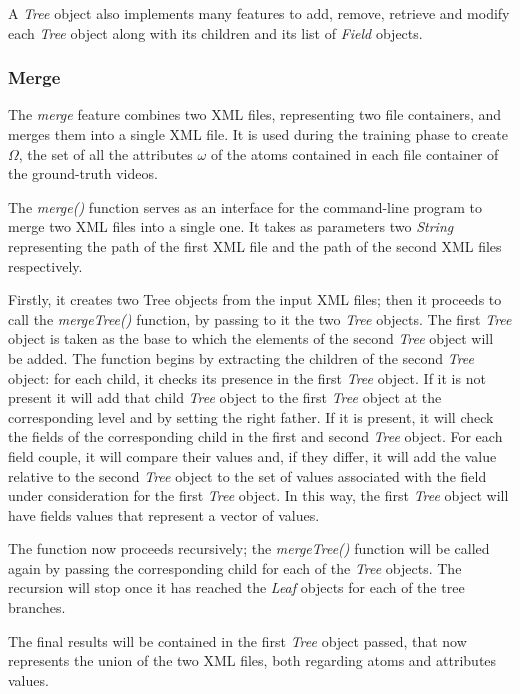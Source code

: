 A \emph{Tree} object also implements many features to add, remove, retrieve and modify each \emph{Tree} object along with its children and its list of \emph{Field} objects.

\subsubsection*{Merge}

The \emph{merge} feature combines two XML files, representing two file containers, and merges them into a single XML file. It is used during the training phase to create $\Omega$, the set of all the attributes $\omega$ of the atoms contained in each file container of the ground-truth videos.

The \emph{merge()} function serves as an interface for the command-line program to merge two XML files into a single one. It takes as parameters two \emph{String} representing the path of the first XML file and the path of the second XML files respectively.

Firstly, it creates two Tree objects from the input XML files; then it proceeds to call the \emph{mergeTree()} function, by passing to it the two \emph{Tree} objects. The first \emph{Tree} object is taken as the base to which the elements of the second \emph{Tree} object will be added. The function begins by extracting the children of the second \emph{Tree} object: for each child, it checks its presence in the first \emph{Tree} object.
If it is not present it will add that child \emph{Tree} object to the first \emph{Tree} object at the corresponding level and by setting the right father.
If it is present, it will check the fields of the corresponding child in the first and second \emph{Tree} object. For each field couple, it will compare their values and, if they differ, it will add the value relative to the second \emph{Tree} object to the set of values associated with the field under consideration for the first \emph{Tree} object. In this way, the first \emph{Tree} object will have fields values that represent a vector of values.

The function now proceeds recursively; the \emph{mergeTree()} function will be called again by passing the corresponding child for each of the \emph{Tree} objects. The recursion will stop once it has reached the \emph{Leaf} objects for each of the tree branches.

The final results will be contained in the first \emph{Tree} object passed, that now represents the union of the two XML files, both regarding atoms and attributes values.

